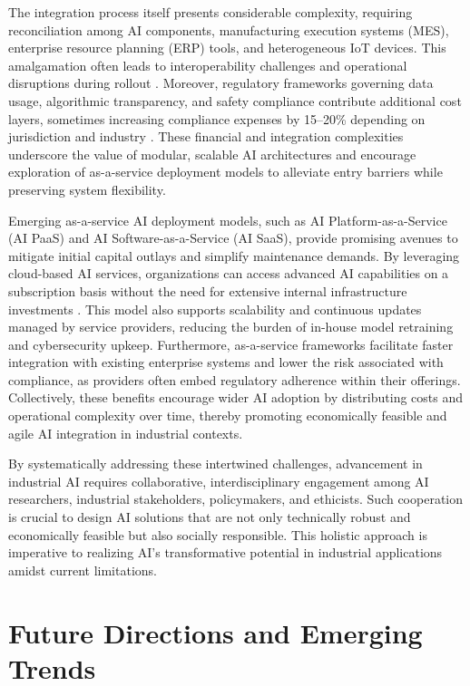 \documentclass[sigconf]{acmart}
\begin{document}
The integration process itself presents considerable complexity, requiring reconciliation among AI components, manufacturing execution systems (MES), enterprise resource planning (ERP) tools, and heterogeneous IoT devices. This amalgamation often leads to interoperability challenges and operational disruptions during rollout \cite{ref6,ref44}. Moreover, regulatory frameworks governing data usage, algorithmic transparency, and safety compliance contribute additional cost layers, sometimes increasing compliance expenses by 15–20\% depending on jurisdiction and industry \cite{ref2,ref13}. These financial and integration complexities underscore the value of modular, scalable AI architectures and encourage exploration of as-a-service deployment models to alleviate entry barriers while preserving system flexibility.

Emerging as-a-service AI deployment models, such as AI Platform-as-a-Service (AI PaaS) and AI Software-as-a-Service (AI SaaS), provide promising avenues to mitigate initial capital outlays and simplify maintenance demands. By leveraging cloud-based AI services, organizations can access advanced AI capabilities on a subscription basis without the need for extensive internal infrastructure investments \cite{ref12,ref35}. This model also supports scalability and continuous updates managed by service providers, reducing the burden of in-house model retraining and cybersecurity upkeep. Furthermore, as-a-service frameworks facilitate faster integration with existing enterprise systems and lower the risk associated with compliance, as providers often embed regulatory adherence within their offerings. Collectively, these benefits encourage wider AI adoption by distributing costs and operational complexity over time, thereby promoting economically feasible and agile AI integration in industrial contexts.

\vspace{1em}
By systematically addressing these intertwined challenges, advancement in industrial AI requires collaborative, interdisciplinary engagement among AI researchers, industrial stakeholders, policymakers, and ethicists. Such cooperation is crucial to design AI solutions that are not only technically robust and economically feasible but also socially responsible. This holistic approach is imperative to realizing AI's transformative potential in industrial applications amidst current limitations.

\section{Future Directions and Emerging Trends}
\end{document}
